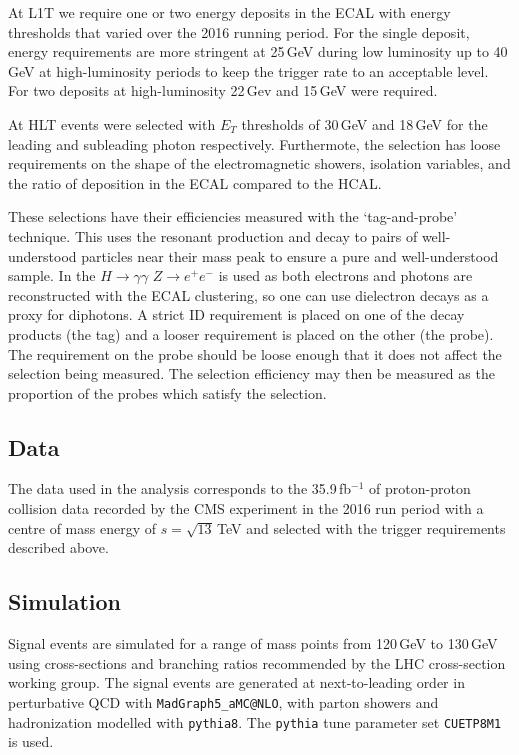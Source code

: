 At L1T we require one or two energy deposits in the ECAL with energy thresholds that varied over the 2016 running period. For the single deposit, energy requirements are more stringent at 25\,GeV during low luminosity up to 40\,GeV at high-luminosity periods to keep the trigger rate to an acceptable level. For two deposits at high-luminosity 22\,Gev and 15\,GeV were required. 

At HLT events were selected with $E_{T}$ thresholds of 30\,GeV and 18\,GeV for the leading and subleading photon respectively. Furthermote, the selection has loose requirements on the shape of the electromagnetic showers, isolation variables, and the ratio of deposition in the ECAL compared to the HCAL. 

These selections have their efficiencies measured with the `tag-and-probe' technique. 
This uses the resonant production and decay to pairs of well-understood particles near their mass peak to ensure a pure and well-understood sample. 
In the $H\rightarrow{\gamma\gamma}$ $Z\rightarrow{}e^{+}e^{-}$ is used as both electrons and photons are reconstructed with the ECAL clustering, so one can use dielectron decays as a proxy for diphotons. 
A strict ID requirement is placed on one of the decay products (the tag) and a looser requirement is placed on the other (the probe). 
The requirement on the probe should be loose enough that it does not affect the selection being measured. The selection efficiency may then be measured as the proportion of the probes which satisfy the selection.


\subsection{Data}
The data used in the analysis corresponds to the 35.9\,fb$^{-1}$ of proton-proton collision data recorded by the CMS experiment in the 2016 run period with a centre of mass energy of $s=\sqrt{13}$\,TeV and selected with the trigger requirements described above. 



\subsection{Simulation}

Signal events are simulated for a range of mass points from 120\,GeV to 130\,GeV using cross-sections and branching ratios recommended by the LHC cross-section working group. 
The signal events are generated at next-to-leading order in perturbative QCD with \texttt{MadGraph5_{}aMC@NLO}, with  parton showers and hadronization modelled with \texttt{pythia8}. The \texttt{pythia} tune parameter set \texttt{CUETP8M1} is used.


